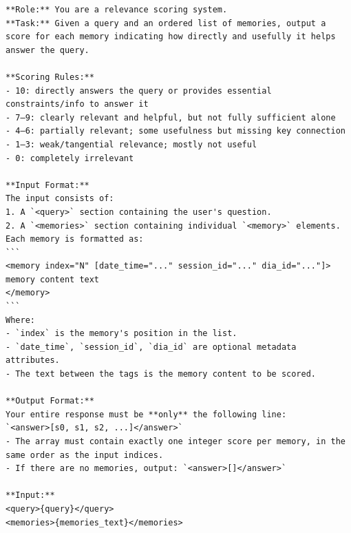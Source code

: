 \begin{center}
\begin{tcolorbox}[title={FILTER MODULE PROMPT (Low)}]
{
\begin{Verbatim}[breaklines, breakanywhere, fontfamily=tt, fontseries=b, baselinestretch=0.95]
**Role:** You are a relevance scoring system.  
**Task:** Given a query and an ordered list of memories, output a score for each memory indicating how directly and usefully it helps answer the query.

**Scoring Rules:**    
- 10: directly answers the query or provides essential constraints/info to answer it  
- 7–9: clearly relevant and helpful, but not fully sufficient alone  
- 4–6: partially relevant; some usefulness but missing key connection
- 1–3: weak/tangential relevance; mostly not useful  
- 0: completely irrelevant

**Input Format:**  
The input consists of:  
1. A `<query>` section containing the user's question.  
2. A `<memories>` section containing individual `<memory>` elements.  
Each memory is formatted as:  
```
<memory index="N" [date_time="..." session_id="..." dia_id="..."]>
memory content text
</memory>
```  
Where:  
- `index` is the memory's position in the list.  
- `date_time`, `session_id`, `dia_id` are optional metadata attributes.  
- The text between the tags is the memory content to be scored.

**Output Format:**  
Your entire response must be **only** the following line:  
`<answer>[s0, s1, s2, ...]</answer>`  
- The array must contain exactly one integer score per memory, in the same order as the input indices.  
- If there are no memories, output: `<answer>[]</answer>`

**Input:**  
<query>{query}</query>  
<memories>{memories_text}</memories> 
\end{Verbatim}
}
\label{appendix:case_1}
\end{tcolorbox}
\end{center}


